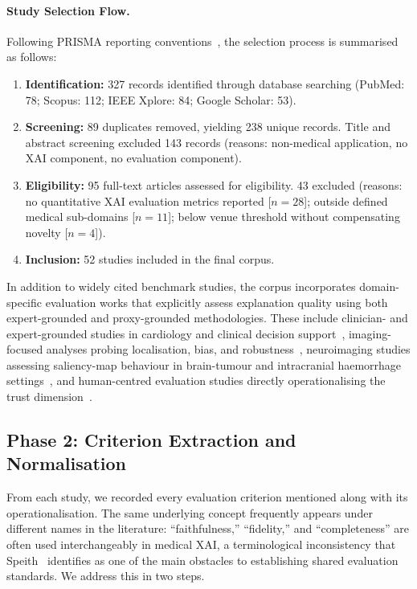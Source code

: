 \paragraph{Study Selection Flow.}
Following PRISMA reporting conventions~\cite{page2021prisma}, the selection process is summarised as follows:
\begin{enumerate}
    \item \textbf{Identification:} 327 records identified through database searching (PubMed: 78; Scopus: 112; IEEE Xplore: 84; Google Scholar: 53).
    \item \textbf{Screening:} 89 duplicates removed, yielding 238 unique records. Title and abstract screening excluded 143 records (reasons: non-medical application, no XAI component, no evaluation component).
    \item \textbf{Eligibility:} 95 full-text articles assessed for eligibility. 43 excluded (reasons: no quantitative XAI evaluation metrics reported [$n = 28$]; outside defined medical sub-domains [$n = 11$]; below venue threshold without compensating novelty [$n = 4$]).
    \item \textbf{Inclusion:} 52 studies included in the final corpus.
\end{enumerate}

In addition to widely cited benchmark studies, the corpus incorporates domain-specific evaluation works that explicitly assess explanation quality using both expert-grounded and proxy-grounded methodologies. These include clinician- and expert-grounded studies in cardiology and clinical decision support~\cite{Vazquez2021, Piculin2022, Nurmaini2022, MorenoSanchez2023, Pandey2024}, imaging-focused analyses probing localisation, bias, and robustness~\cite{Lee2021Cardiomegaly, palatnik2021xai, Repetto2025EvaluatingTR, Pertuz2023, Patricio2024}, neuroimaging studies assessing saliency-map behaviour in brain-tumour and intracranial haemorrhage settings~\cite{Nazir2024UtilizingCC, Chmiel2023, Kohan2025}, and human-centred evaluation studies directly operationalising the trust dimension~\cite{IhongbeFouad2024, 11355720}.

\subsection{Phase 2: Criterion Extraction and Normalisation}

From each study, we recorded every evaluation criterion mentioned along with
its operationalisation. The same underlying concept frequently appears under
different names in the literature: ``faithfulness,'' ``fidelity,'' and ``completeness'' are
often used interchangeably in medical XAI, a terminological inconsistency that
Speith~\cite{speith2022review} identifies as one of the main obstacles to
establishing shared evaluation standards. We address this in two steps.

